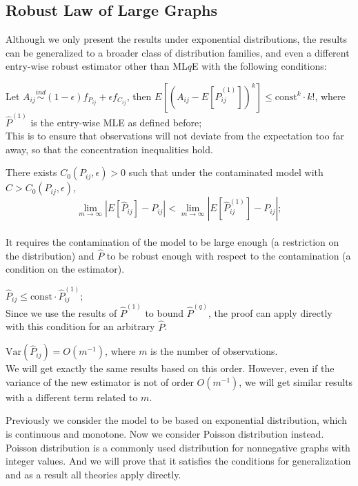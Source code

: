 \documentclass[simplex.tex]{subfiles}
\begin{document}
\subsection{Robust Law of Large Graphs}

Although we only present the results under exponential distributions, the results can be generalized to a broader class of distribution families, and even a different entry-wise robust estimator other than ML$q$E with the following conditions:
\begin{compactenum}
\item Let $A_{ij} \stackrel{ind}{\sim} (1-\epsilon) f_{P_{ij}} + \epsilon f_{C_{ij}}$, then $E[(A_{ij} - E[\hat{P}_{ij}^{(1)}])^k] \le \mathrm{const}^k \cdot k!$, where $\hat{P}^{(1)}$ is the entry-wise MLE as defined before;\\
This is to ensure that observations will not deviate from the expectation too far away, so that the concentration inequalities hold.
\item There exists $C_0(P_{ij}, \epsilon) > 0$ such that under the contaminated model with $C > C_0(P_{ij}, \epsilon)$,
\[
	\lim_{m \to \infty} \left| E[\hat{P}_{ij}] - P_{ij} \right| < 
    \lim_{m \to \infty} \left| E[\hat{P}^{(1)}_{ij}] - P_{ij} \right|;
\]\\
It requires the contamination of the model to be large enough (a restriction on the distribution) and $\hat{P}$ to be robust enough with respect to the contamination (a condition on the estimator).
\item $\hat{P}_{ij} \le \mathrm{const} \cdot \hat{P}_{ij}^{(1)}$;\\
Since we use the results of $\hat{P}^{(1)}$ to bound $\hat{P}^{(q)}$, the proof can apply directly with this condition for an arbitrary $\hat{P}$.
\item $\mathrm{Var}(\hat{P}_{ij}) = O(m^{-1})$, where $m$ is the number of observations.\\
We will get exactly the same results based on this order. However, even if the variance of the new estimator is not of order $O(m^{-1})$, we will get similar results with a different term related to $m$.
\end{compactenum}

Previously we consider the model to be based on exponential distribution, which is continuous and monotone. Now we consider Poisson distribution instead. Poisson distribution is a commonly used distribution for nonnegative graphs with integer values. And we will prove that it satisfies the conditions for generalization and as a result all theories apply directly.
\end{document}
